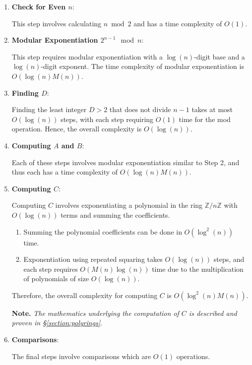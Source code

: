 \documentclass{article}
\theoremstyle{plain}
\theoremstyle{definition}
\begin{document}
\begin{enumerate}
    \item \textbf{Check for Even \( n \)}:
    
        This step involves calculating $n \bmod{2}$ and has a time complexity of \( O(1) \).

    \item \textbf{Modular Exponentiation \( 2^{n-1} \mod n \)}:
    
        This step requires modular exponentiation with a \( \log(n) \)-digit base and a \( \log(n) \)-digit exponent. The time complexity of modular exponentiation is \( O(\log(n) M(n)) \).

    \item \textbf{Finding \( D \)}:
    
        Finding the least integer \( D > 2 \) that does not divide \( n-1 \) takes at most \( O(\log(n)) \) steps, with each step requiring \( O(1) \) time for the mod operation. Hence, the overall complexity is \( O(\log(n)) \).

    \item \textbf{Computing \( A \) and \( B \)}:
    
        Each of these steps involves modular exponentiation similar to Step 2, and thus each has a time complexity of \( O(\log(n) M(n)) \).

    \item \textbf{Computing \( C \)}:
    
        Computing \( C \) involves exponentiating a polynomial in the ring \(\mathbb{Z}/n\mathbb{Z}\) with \( O(\log(n)) \) terms and summing the coefficients.
        \begin{enumerate}
            \item Summing the polynomial coefficients can be done in \( O(\log^2(n)) \) time.
            \item Exponentiation using repeated squaring takes \( O(\log(n)) \) steps, and each step requires \( O(M(n)\log(n)) \) time due to the multiplication of polynomials of size \( O(\log(n)) \).
        \end{enumerate}
         Therefore, the overall complexity for computing \( C \) is \( O(\log^2(n) M(n)) \).
         
         \textbf{Note.} \textit{The mathematics underlying the computation of \( C \) is described and proven in \S \ref{section:polyrings}.}

    \item \textbf{Comparisons}:
    
        The final steps involve comparisons which are \( O(1) \) operations.
\end{enumerate}
\end{document}
